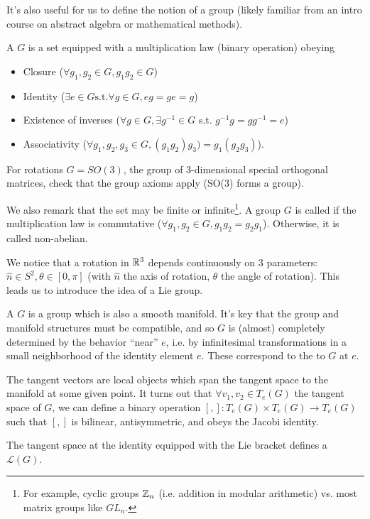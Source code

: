 It's also useful for us to define the notion of a group (likely familiar from an intro course on abstract algebra or mathematical methods).

\begin{defn}
A  $G$ is a set equipped with a multiplication law (binary operation) obeying
\begin{itemize}
    \item Closure ($\forall g_1, g_2\in G, g_1g_2 \in G$)
    \item Identity ($\exists e\in G \text{s.t.} \forall g\in G, eg = ge = g$)
    \item Existence of inverses ($\forall g \in G, \exists g^{-1} \in G$ s.t. $g^{-1}g=gg^{-1}=e$)
    \item Associativity ($\forall g_1,g_2,g_3\in G, (g_1g_2)g_3)=g_1(g_2g_3)$).
\end{itemize}
\end{defn}
\begin{ex}
 For rotations $G=SO(3)$, the group of 3-dimensional special orthogonal matrices, check that the group axioms apply (SO(3) forms a group).
\end{ex}

We also remark that the set may be finite or infinite\footnote{For example, cyclic groups $\mathbb{Z}_n$ (i.e. addition in modular arithmetic) vs. most matrix groups like $GL_n$.}. A group $G$ is called  if the multiplication law is commutative ($\forall g_1,g_2\in G, g_1g_2=g_2g_1$). Otherwise, it is called non-abelian.

We notice that a rotation in $\mathbb{R}^3$ depends continuously on 3 parameters: $\hat n\in S^2, \theta \in[0,\pi]$ (with $\hat n$ the axis of rotation, $\theta$ the angle of rotation). This leads us to introduce the idea of a Lie group.
\begin{defn}
A  $G$ is a group which is also a smooth manifold. It's key that the group and manifold structures must be compatible, and so $G$ is (almost) completely determined by the behavior ``near'' $e$, i.e. by infinitesimal transformations in a small neighborhood of the identity element $e$. These correspond to the  to $G$ at $e$.
\end{defn}

The tangent vectors are local objects which span the tangent space to the manifold at some given point. It turns out that $\forall v_1,v_2\in T_e(G)$ the tangent space of $G$, we can define a binary operation $[,]:T_e(G)\times T_e(G) \to T_e(G)$ such that $[,]$ is bilinear, antisymmetric, and obeys the Jacobi identity. 
\begin{defn}
The tangent space at the identity equipped with the Lie bracket defines a  $\mathcal{L}(G).$
\end{defn}

